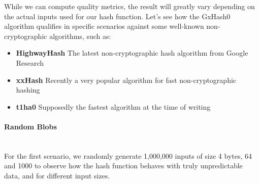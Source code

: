 \documentclass[10pt]{article}
\begin{document}
While we can compute quality metrics, the result will greatly vary depending on the actual inputs used for our hash function. Let's see how the GxHash0 algorithm qualifies in specific scenarios against some well-known non-cryptographic algorithms, such as:

\begin{itemize}
\item \textbf{HighwayHash}\cite{highwayhash} The latest non-cryptographic hash algorithm from Google Research
\item \textbf{xxHash}\cite{xxhash} Recently a very popular algorithm for fast non-cryptographic hashing
\item \textbf{t1ha0}\cite{rust-t1ha} Supposedly the fastest algorithm at the time of writing
\end{itemize}

\clearpage
\paragraph{Random Blobs}\leavevmode\\
For the first scenario, we randomly generate 1,000,000 inputs of size 4 bytes, 64 and 1000 to observe how the hash function behaves with truly unpredictable data, and for different input sizes.
\end{document}
